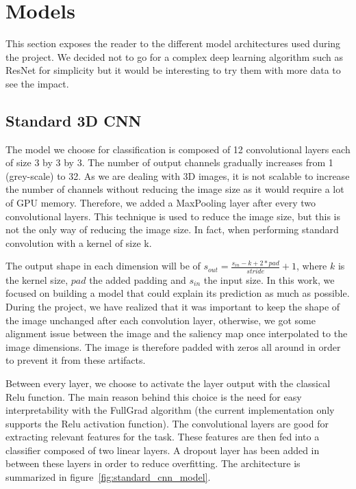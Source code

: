 \chapter{Models}
\label{chap:models}
This section exposes the reader to the different model architectures used during the project. We decided not to go for a complex deep learning algorithm such as ResNet\cite{resNet_he2015deep} for simplicity but it would be interesting to try them with more data to see the impact.

\section{Standard 3D CNN}
\label{sec:standard_cnn}

The model we choose for classification is composed of 12 convolutional layers each of size 3 by 3 by 3. The number of output channels gradually increases from 1 (grey-scale) to 32. As we are dealing with 3D images, it is not scalable to increase the number of channels without reducing the image size as it would require a lot of GPU memory. Therefore, we added a MaxPooling layer after every two convolutional layers. This technique is used to reduce the image size, but this is not the only way of reducing the image size. In fact, when performing standard convolution with a kernel of size k.

The output shape in each dimension will be of $s_{out} = \frac{s_{in} - k + 2* pad}{stride} + 1$, where $k$ is the kernel size, $pad$ the added padding and $s_{in}$ the input size. In this work, we focused on building a model that could explain its prediction as much as possible. During the project, we have realized that it was important to keep the shape of the image unchanged after each convolution layer, otherwise, we got some alignment issue between the image and the saliency map once interpolated to the image dimensions. The image is therefore padded with zeros all around in order to prevent it from these artifacts.

Between every layer, we choose to activate the layer output with the classical Relu\cite{relu_10.5555/3104322.3104425} function. The main reason behind this choice is the need for easy interpretability with the FullGrad algorithm (the current implementation only supports the Relu activation function).  
The convolutional layers are good for extracting relevant features for the task. These features are then fed into a classifier composed of two linear layers. A dropout\cite{dropout_10.5555/2627435.2670313} layer has been added in between these layers in order to reduce overfitting. The architecture is summarized in figure~\ref{fig:standard_cnn_model}.

